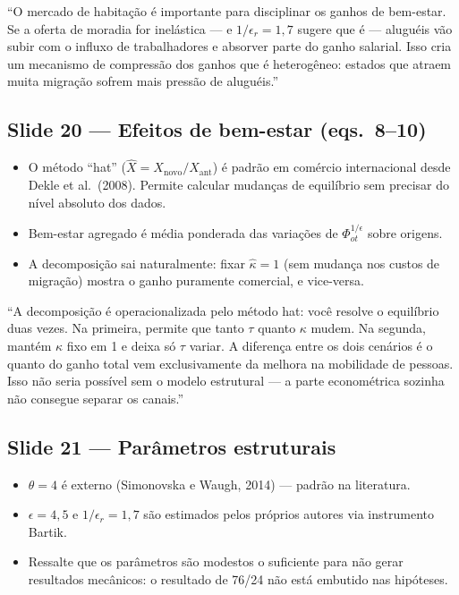 \documentclass[12pt, a4paper]{article}
\begin{document}
\begin{mdframed}[style=sintese]
``O mercado de habitação é importante para disciplinar os ganhos de bem-estar. Se a oferta de
moradia for inelástica --- e $1/\epsilon_r = 1{,}7$ sugere que é --- aluguéis vão subir com
o influxo de trabalhadores e absorver parte do ganho salarial. Isso cria um mecanismo de
compressão dos ganhos que é heterogêneo: estados que atraem muita migração sofrem mais
pressão de aluguéis.''
\end{mdframed}

\subsection*{Slide 20 --- Efeitos de bem-estar (eqs.\ 8--10)}

\begin{itemize}
    \item O método ``hat'' ($\widehat{X} = X_{\mathrm{novo}} / X_{\mathrm{ant}}$) é padrão em comércio internacional desde Dekle et al.\ (2008). Permite calcular mudanças de equilíbrio sem precisar do nível absoluto dos dados.
    \item Bem-estar agregado é média ponderada das variações de $\Phi_{ot}^{1/\epsilon}$ sobre origens.
    \item A decomposição sai naturalmente: fixar $\hat\kappa = 1$ (sem mudança nos custos de migração) mostra o ganho puramente comercial, e vice-versa.
\end{itemize}

\begin{mdframed}[style=sintese]
``A decomposição é operacionalizada pelo método hat: você resolve o equilíbrio duas vezes.
Na primeira, permite que tanto $\tau$ quanto $\kappa$ mudem. Na segunda, mantém $\kappa$ fixo
em 1 e deixa só $\tau$ variar. A diferença entre os dois cenários é o quanto do ganho total
vem exclusivamente da melhora na mobilidade de pessoas.
Isso não seria possível sem o modelo estrutural --- a parte econométrica sozinha não consegue separar os canais.''
\end{mdframed}

\subsection*{Slide 21 --- Parâmetros estruturais}

\begin{itemize}
    \item $\theta = 4$ é externo (Simonovska e Waugh, 2014) --- padrão na literatura.
    \item $\epsilon = 4{,}5$ e $1/\epsilon_r = 1{,}7$ são estimados pelos próprios autores via instrumento Bartik.
    \item Ressalte que os parâmetros são modestos o suficiente para não gerar resultados mecânicos: o resultado de 76/24 não está embutido nas hipóteses.
\end{itemize}
\end{document}
